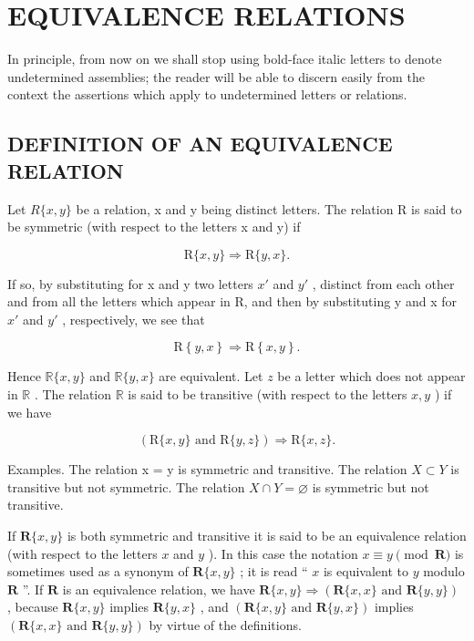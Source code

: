 \section{EQUIVALENCE RELATIONS}

In principle, from now on we shall stop using bold-face italic letters to denote undetermined assemblies; the reader will be able to discern easily from the context the assertions which apply to undetermined letters or relations.

\subsection{DEFINITION OF AN EQUIVALENCE RELATION}

Let \(R\{x, y\}\) be a relation, x and y being distinct letters. The relation R is said to be symmetric (with respect to the letters x and y) if

\[
\mathrm{R} \{x, y \} \Longrightarrow \mathrm{R} \{y, x \}.
\]

If so, by substituting for x and y two letters \(x'\) and \(y'\) , distinct from each other and from all the letters which appear in R, and then by substituting y and x for \(x'\) and \(y'\) , respectively, we see that

\[
\mathrm{R} \left\{y, x \right\} \Longrightarrow \mathrm{R} \left\{x, y \right\}.
\]

Hence \(\mathbb{R}\{x, y\}\) and \(\mathbb{R}\{y, x\}\) are equivalent. Let \(z\) be a letter which does not appear in \(\mathbb{R}\) . The relation \(\mathbb{R}\) is said to be transitive (with respect to the letters \(x, y\) ) if we have

\[
(\mathrm{R} \{x, y \} \text {   and   } \mathrm{R} \{y, z \}) \Longrightarrow \mathrm{R} \{x, z \}.
\]

Examples. The relation x = y is symmetric and transitive. The relation \(X \subset Y\) is transitive but not symmetric. The relation \(X \cap Y = \varnothing\) is symmetric but not transitive.

If \(\mathbf{R}\{x, y\}\) is both symmetric and transitive it is said to be an equivalence relation (with respect to the letters \(x\) and \(y\) ). In this case the notation \(x \equiv y \pmod{\mathbf{R}}\) is sometimes used as a synonym of \(\mathbf{R}\{x, y\}\) ; it is read `` \(x\) is equivalent to \(y\) modulo \(\mathbf{R}\) ''. If \(\mathbf{R}\) is an equivalence relation, we have \(\mathbf{R}\{x, y\} \Longrightarrow (\mathbf{R}\{x, x\} \text{ and } \mathbf{R}\{y, y\})\) , because \(\mathbf{R}\{x, y\}\) implies \(\mathbf{R}\{y, x\}\) , and \((\mathbf{R}\{x, y\} \text{ and } \mathbf{R}\{y, x\})\) implies \((\mathbf{R}\{x, x\} \text{ and } \mathbf{R}\{y, y\})\) by virtue of the definitions.


